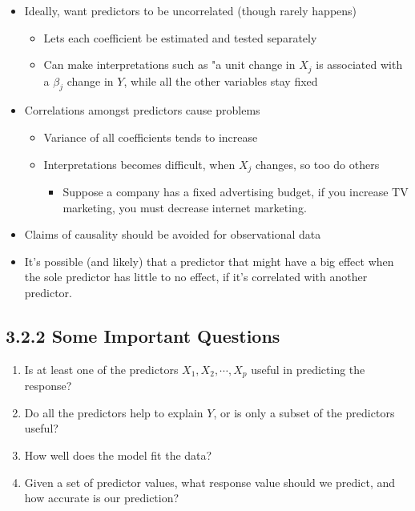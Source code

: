         \begin{note}
           \begin{itemize}
               \item Ideally, want predictors to be uncorrelated (though rarely happens)
               \begin{itemize}
                   \item Lets each coefficient be estimated and tested separately
                   \item Can make interpretations such as "a unit change in $X_j$ is associated with a $\beta_j$ change in $Y$, while all the other variables stay fixed
               \end{itemize}
              \item Correlations amongst predictors cause problems
              \begin{itemize}
                  \item Variance of all coefficients tends to increase
                  \item  Interpretations becomes difficult, when $X_j$ changes, so too do others
                  \begin{itemize}
                      \item Suppose a company has a fixed advertising budget, if you increase TV marketing, you must decrease internet marketing.
                  \end{itemize}
              \end{itemize}
             \item Claims of causality should be avoided for observational data
             \item It's possible (and likely) that a predictor that might have a big effect when the sole predictor has little to no effect, if it's correlated with another predictor.
           \end{itemize}
          \end{note}

        \subsection*{3.2.2 Some Important Questions}\label{some-important-questions}
        \begin{enumerate}
            \item Is at least one of the predictors $X_1, X_2, \cdots, X_p$ useful in predicting the response?
            \item Do all the predictors help to explain $Y$, or is only a subset of the predictors useful?
            \item How well does the model fit the data?
            \item Given a set of predictor values, what response value should we predict, and how accurate is our prediction?
        \end{enumerate}
